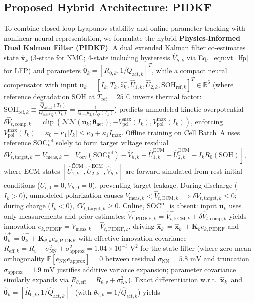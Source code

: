 \documentclass[balance,nocopyright,upint,varvw,hyphenate,barcolor=NavyBlue,nolists]{asmejour}
\begin{document}
\subsection{Proposed Hybrid Architecture: PIDKF}
To combine closed-loop Lyapunov stability and online parameter tracking with nonlinear neural representation, we formulate the hybrid \textbf{Physics-Informed Dual Kalman Filter (PIDKF)}. A dual extended Kalman filter co-estimates state $\hat{\mathbf{x}}_k$ (3-state for NMC; 4-state including hysteresis $\hat{V}_{h,k}$ via Eq.~\eqref{eqn:vt_lfp} for LFP) and parameters $\hat{\boldsymbol{\theta}}_k = [R_{0,k}, 1/Q_{\text{act},k}]^T$, while a compact neural compensator with input $\mathbf{u}_k = [I_k, T_k, \hat{z}_k^-, \hat{U}_{1,k}^-, \hat{U}_{2,k}^-, \text{SOH}_{\text{ref},k}]^T \in \mathbb{R}^6$ (where reference degradation SOH at $T_{\text{ref}}=25^\circ\text{C}$ inverts thermal factor: $\text{SOH}_{\text{ref},k} \equiv \frac{\hat{Q}_{\text{act},k}(T_k)}{Q_{\text{init}} f_Q(T_k)} = \frac{1}{Q_{\text{init}}\theta_{2,k} f_Q(T_k)}$) predicts unmodeled kinetic overpotential $\delta \hat{V}_{t,\text{comp},k} = \operatorname{clip}(\mathcal{NN}(\mathbf{u}_k; \boldsymbol{\theta}_{\text{net}}), -V_{\text{pol}}^{\max}(I_k), V_{\text{pol}}^{\max}(I_k))$, enforcing $V_{\text{pol}}^{\max}(I_k) = \kappa_0 + \kappa_1 |I_k| \le \kappa_0 + \kappa_1 I_{\max}$. Offline training on Cell Batch~A uses reference $\text{SOC}_k^{\text{ref}}$ solely to form target voltage residual $\delta V_{t,\text{target},k} \equiv V_{\text{meas},k} - [V_{\text{ocv}}(\text{SOC}_k^{\text{ref}}) - \hat{V}_{h,k} - \hat{U}_{1,k}^{\text{ECM}} - \hat{U}_{2,k}^{\text{ECM}} - I_k R_0(\text{SOH})]$, where ECM states $[\hat{U}_{1,k}^{\text{ECM}}, \hat{U}_{2,k}^{\text{ECM}}, \hat{V}_{h,k}]$ are forward-simulated from rest initial conditions ($U_{i,0}=0, V_{h,0}=0$), preventing target leakage. During discharge ($I_k > 0$), unmodeled polarization causes $V_{\text{meas},k} < \hat{V}_{t,\text{ECM},k} \implies \delta V_{t,\text{target},k} \le 0$; during charge ($I_k < 0$), $\delta V_{t,\text{target},k} \ge 0$. Online, $\text{SOC}^{\text{ref}}$ is absent: input $\mathbf{u}_k$ uses only measurements and prior estimates; $\hat{V}_{t,\text{PIDKF},k}^- = \hat{V}_{t,\text{ECM},k}^- + \delta \hat{V}_{t,\text{comp},k}$ yields innovation $e_{k,\text{PIDKF}} = V_{\text{meas},k} - \hat{V}_{t,\text{PIDKF},k}^-$, driving $\hat{\mathbf{x}}_k^+ = \hat{\mathbf{x}}_k^- + \mathbf{K}_k e_{k,\text{PIDKF}}$ and $\hat{\boldsymbol{\theta}}_k^+ = \hat{\boldsymbol{\theta}}_k^- + \mathbf{K}_{\theta,k} e_{k,\text{PIDKF}}$ with effective innovation covariance $R_{\text{eff},k} = R_v + \sigma_{\text{NN}}^2 + \sigma_{\text{approx}}^2 = 1.04 \times 10^{-3}\text{ V}^2$ for the state filter (where zero-mean orthogonality $\mathbb{E}[e_{\text{NN}} e_{\text{approx}}] = 0$ between residual $\sigma_{\text{NN}} = 5.8\text{ mV}$ and truncation $\sigma_{\text{approx}} = 1.9\text{ mV}$ justifies additive variance expansion; parameter covariance similarly expands via $R_{\theta,\text{eff}} = R_{\theta,v} + \sigma_{\text{NN}}^2$). Exact differentiation w.r.t.\ $\hat{\mathbf{x}}_k^-$ and $\hat{\boldsymbol{\theta}}_k = [\hat{R}_{0,k}, 1/\hat{Q}_{\text{act},k}]^T$ (with $\theta_{2,k} = 1/\hat{Q}_{\text{act},k}$) yields 
\end{document}
